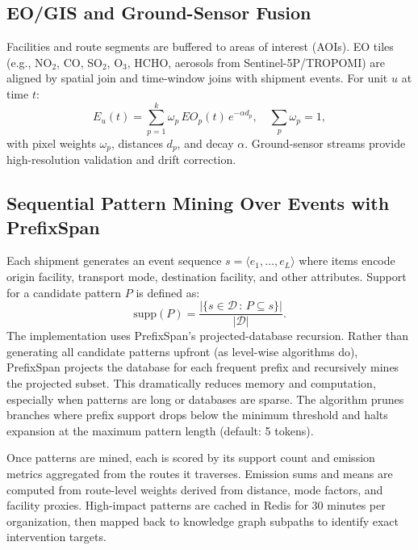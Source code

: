 \documentclass[conference]{IEEEtran}
\begin{document}
\subsection{EO/GIS and Ground-Sensor Fusion}
Facilities and route segments are buffered to areas of interest (AOIs). EO tiles (e.g., NO$_2$, CO, SO$_2$, O$_3$, HCHO, aerosols from Sentinel-5P/TROPOMI) are aligned by spatial join and time-window joins with shipment events. For unit $u$ at time $t$:
\begin{equation}
E_u(t)=\sum_{p=1}^{k} \omega_p\, EO_p(t)\, e^{-\alpha d_p}, \quad \sum_p \omega_p=1,
\end{equation}
with pixel weights $\omega_p$, distances $d_p$, and decay $\alpha$. Ground-sensor streams provide high-resolution validation and drift correction.

\subsection{Sequential Pattern Mining Over Events with PrefixSpan}
Each shipment generates an event sequence $s=\langle e_1,\dots,e_L\rangle$ where items encode origin facility, transport mode, destination facility, and other attributes. Support for a candidate pattern $P$ is defined as:
\begin{equation}
\mathrm{supp}(P)=\frac{|\{s\in\mathcal{D}\,:\,P\subseteq s\}|}{|\mathcal{D}|}.
\end{equation}
The implementation uses PrefixSpan's projected-database recursion. Rather than generating all candidate patterns upfront (as level-wise algorithms do), PrefixSpan projects the database for each frequent prefix and recursively mines the projected subset. This dramatically reduces memory and computation, especially when patterns are long or databases are sparse. The algorithm prunes branches where prefix support drops below the minimum threshold and halts expansion at the maximum pattern length (default: 5 tokens).

Once patterns are mined, each is scored by its support count and emission metrics aggregated from the routes it traverses. Emission sums and means are computed from route-level weights derived from distance, mode factors, and facility proxies. High-impact patterns are cached in Redis for 30 minutes per organization, then mapped back to knowledge graph subpaths to identify exact intervention targets.
\end{document}
